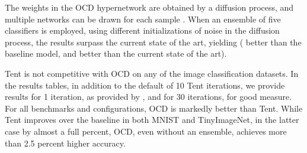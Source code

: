\documentclass{article}
\theoremstyle{plain}
\begin{document}
The weights in the OCD hypernetwork are obtained by a diffusion process, and multiple networks can be drawn for each sample . When an ensemble of five classifiers is employed, using different initializations of noise in the diffusion process, the results surpass the current state of the art, yielding  ( better than the baseline model, and  better than the current state of the art).

Tent is not competitive with OCD on any of the image classification datasets. In the results tables, in addition to the default of 10 Tent iterations, we provide results for 1 iteration, as provided by \citet{wang2021tent}, and for 30 iterations, for good measure. For all benchmarks and configurations, OCD is markedly better than Tent. While Tent improves over the baseline in both MNIST and TinyImageNet, in the latter case by almost a full percent, OCD, even without an ensemble, achieves more than 2.5 percent higher accuracy.
\end{document}
